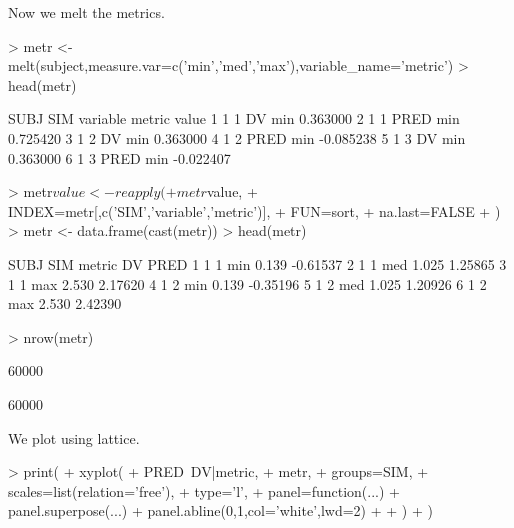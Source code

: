 Now we melt the metrics.
\begin{Schunk}
\begin{Sinput}
> metr <- melt(subject,measure.var=c('min','med','max'),variable_name='metric')
> head(metr)
\end{Sinput}
\begin{Soutput}
  SUBJ SIM variable metric     value
1    1   1       DV    min  0.363000
2    1   1     PRED    min  0.725420
3    1   2       DV    min  0.363000
4    1   2     PRED    min -0.085238
5    1   3       DV    min  0.363000
6    1   3     PRED    min -0.022407
\end{Soutput}
\begin{Sinput}
> metr$value <- reapply(
+ 	metr$value,
+ 	INDEX=metr[,c('SIM','variable','metric')],
+ 	FUN=sort,
+ 	na.last=FALSE
+ )
> metr <- data.frame(cast(metr))
> head(metr)
\end{Sinput}
\begin{Soutput}
  SUBJ SIM metric    DV     PRED
1    1   1    min 0.139 -0.61537
2    1   1    med 1.025  1.25865
3    1   1    max 2.530  2.17620
4    1   2    min 0.139 -0.35196
5    1   2    med 1.025  1.20926
6    1   2    max 2.530  2.42390
\end{Soutput}
\begin{Sinput}
> nrow(metr)
\end{Sinput}
\begin{Soutput}
[1] 60000
\end{Soutput}
\begin{Soutput}
[1] 60000
\end{Soutput}
\end{Schunk}
We plot using lattice.
\begin{Schunk}
\begin{Sinput}
> print(
+ 	xyplot(
+ 		PRED~DV|metric,
+ 		metr,
+ 		groups=SIM,
+ 		scales=list(relation='free'),
+ 		type='l',
+ 		panel=function(...){
+ 			panel.superpose(...)
+ 			panel.abline(0,1,col='white',lwd=2)
+ 		}
+ 	)
+ )
\end{Sinput}
\end{Schunk}
